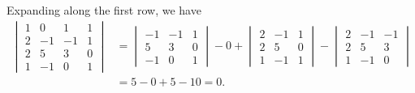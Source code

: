 Expanding along the first row, we have 
\begin{align*}
\begin{vmatrix} 1 & 0 & 1 & 1 \\ 2 & -1 & -1 & 1\\ 2 & 5 & 3 & 0\\ 1 & -1 & 0 & 1 \end{vmatrix} 
&=
\begin{vmatrix} -1 & -1 & 1\\5 & 3 & 0\\-1 & 0 & 1 \end{vmatrix} - 0 + 
\begin{vmatrix} 2 & -1 & 1\\ 2 & 5 & 0\\1 & -1 & 1 \end{vmatrix} - 
\begin{vmatrix}2 & -1 & -1\\2 & 5 & 3\\ 1 & -1 & 0 \end{vmatrix}\\
%
&= 5 - 0 + 5 - 10 = 0.
\end{align*}